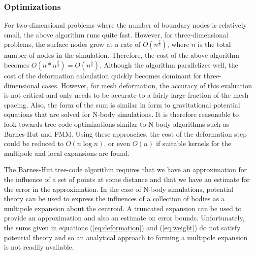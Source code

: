 \subsubsection{Optimizations}

For two-dimensional problems where the number of boundary nodes is
relatively small, the above algorithm runs quite fast.  However, for
three-dimensional problems, the surface nodes grow at a rate of
$O(n^\frac{2}{3})$, where $n$ is the total number of nodes in the
simulation.  Therefore, the cost of the above algorithm becomes
$O(n*n^\frac{2}{3})=O(n^\frac{5}{3})$.  Although the algorithm
parallelizes well, the cost of the deformation calculation quickly
becomes dominant for three-dimensional cases.  However, for mesh
deformation, the accuracy of this evaluation is not critical and only
needs to be accurate to a fairly large fraction of the mesh spacing.
Also, the form of the sum is similar in form to gravitational
potential equations that are solved for N-body simulations.  It is
therefore reasonable to look towards tree-code optimizations similar
to N-body algorithms such as Barnes-Hut\cite{Barnes.1986} and
FMM\cite{Greengard.1987}.  Using these approaches, the cost of the
deformation step could be reduced to $O(n \log n)$, or even $O(n)$ if
suitable kernels for the multipole and local expansions are found.

The Barnes-Hut tree-code algorithm requires that we have an
approximation for the influence of a set of points at some distance
and that we have an estimate for the error in the approximation.  In
the case of N-body simulations, potential theory can be used to
express the influences of a collection of bodies as a multipole
expansion about the centroid.  A truncated expansion can be used to
provide an approximation and also an estimate on error bounds.
Unfortunately, the sums given in equations (\ref{eq:deformation}) and
(\ref{eq:weight}) do not satisfy potential theory and so an analytical
approach to forming a multipole expansion is not readily available.

